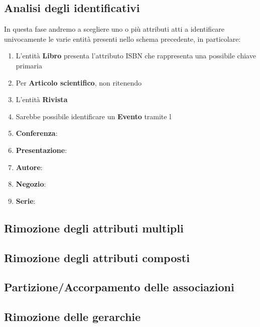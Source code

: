         \subsection{Analisi degli identificativi}
        In questa fase andremo a scegliere uno o più attributi atti a identificare univocamente
        le varie entità presenti nello schema precedente, in particolare:
            \begin{enumerate}
            \item L'entità \textbf{Libro} presenta l'attributo ISBN che rappresenta una possibile chiave primaria
            \item Per \textbf{Articolo scientifico}, non ritenendo 
            \item L'entità \textbf{Rivista} 
            \item Sarebbe possibile identificare un \textbf{Evento} tramite l
            \item \textbf{Conferenza}:
            \item \textbf{Presentazione}: 
            \item \textbf{Autore}: 
            \item \textbf{Negozio}:
            \item \textbf{Serie}: 
            \end{enumerate}
        \subsection{Rimozione degli attributi multipli}
            
        \subsection{Rimozione degli attributi composti}
            
        \subsection{Partizione/Accorpamento delle associazioni}
            
        \subsection{Rimozione delle gerarchie}
    

